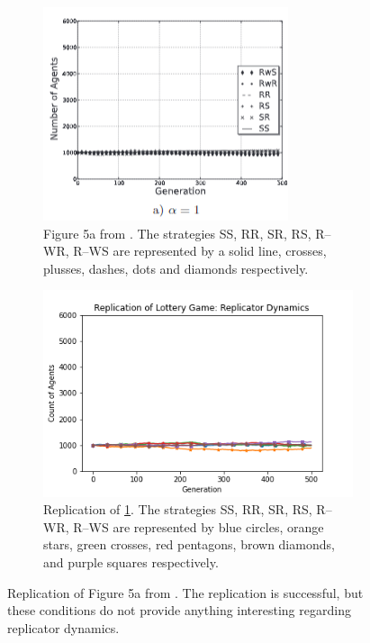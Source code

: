 \FloatBarrier 
\begin{figure}[!h]
  \begin{subfigure}[b]{0.45\textwidth}
    \includegraphics[width=\textwidth]{images/lottery1.png}
    \caption{Figure 5a from \cite{RN30}. The strategies SS, RR, SR, RS, R--WR, R--WS are represented by a solid line, crosses, plusses, dashes, dots and diamonds respectively. }
    \label{lottery1}
  \end{subfigure}
  \hfill
  \begin{subfigure}[b]{0.45\textwidth}
    \includegraphics[width=1.25\textwidth]{images/lottery1_me.png}
    \caption{Replication of \ref{lottery1}. The strategies SS, RR, SR, RS, R--WR, R--WS are represented by blue circles, orange stars, green crosses, red pentagons, brown diamonds, and purple squares respectively.}
    \label{lottery1_me}
  \end{subfigure}
  \caption{Replication of Figure 5a from \cite{RN30}. The replication is successful, but these conditions do not provide anything interesting regarding replicator dynamics.} \label{lottery_comp0}
\end{figure} 
\FloatBarrier

